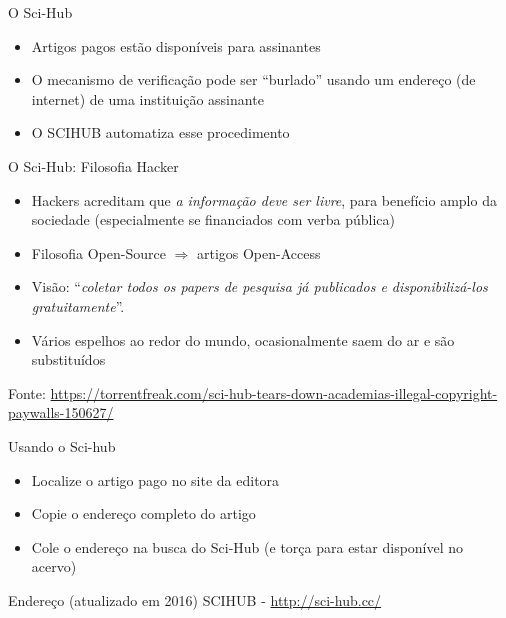 \documentclass{beamer}
\begin{document}
\begin{frame}{O Sci-Hub}
  \begin{itemize}
    \footnotesize
  \item Artigos pagos estão disponíveis para assinantes
  \item O mecanismo de verificação pode ser ``burlado'' usando um
    endereço (de internet) de uma instituição assinante
  \item O SCIHUB automatiza esse procedimento
  \end{itemize}
\end{frame}

\begin{frame}{O Sci-Hub: Filosofia Hacker}
  \begin{itemize}
    \footnotesize
  \item Hackers acreditam que {\em a informação deve ser livre}, para
    benefício amplo da sociedade (\alert{especialmente} se financiados
    com verba pública)
  \item Filosofia Open-Source $\Rightarrow$ artigos Open-Access
  \item Visão: ``{\em coletar todos os papers de pesquisa já
      publicados e disponibilizá-los gratuitamente}''.
  \item Vários espelhos ao redor do mundo, ocasionalmente saem do ar e
    são substituídos
  \end{itemize}

  \tiny
  \hfill Fonte: \url{https://torrentfreak.com/sci-hub-tears-down-academias-illegal-copyright-paywalls-150627/}
\end{frame}

\begin{frame}{Usando o Sci-hub}
  \begin{itemize}
    \footnotesize
  \item Localize o artigo pago no site da editora
  \item Copie o endereço completo do artigo
  \item Cole o endereço na busca do Sci-Hub (e torça para estar
    disponível no acervo)
  \end{itemize}
  \begin{block}{Endereço (atualizado em 2016)}
    SCIHUB - \url{http://sci-hub.cc/}
  \end{block}
\end{frame}
\end{document}
